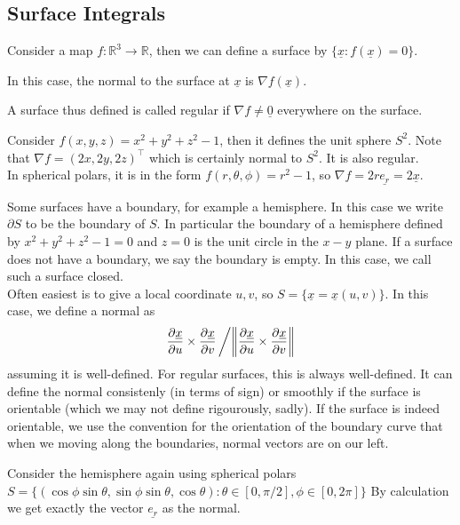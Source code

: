 \subsection{Surface Integrals}
\begin{definition}
    Consider a map $f:\mathbb R^3\to\mathbb R$, then we can define a surface by $\{\underline{x}:f(\underline{x})=0\}$.
\end{definition}
In this case, the normal to the surface at $\underline{x}$ is $\nabla f(\underline{x})$.
\begin{definition}
    A surface thus defined is called regular if $\nabla f\neq \underline{0}$ everywhere on the surface.
\end{definition}
\begin{example}
    Consider $f(x,y,z)=x^2+y^2+z^2-1$, then it defines the unit sphere $S^2$.
    Note that $\nabla f=(2x,2y,2z)^\top$ which is certainly normal to $S^2$.
    It is also regular.\\
    In spherical polars, it is in the form $f(r,\theta,\phi)=r^2-1$, so $\nabla f=2r\underline{e_r}=2\underline{x}$.
\end{example}
Some surfaces have a boundary, for example a hemisphere.
In this case we write $\partial S$ to be the boundary of $S$.
In particular the boundary of a hemisphere defined by $x^2+y^2+z^2-1=0$ and $z=0$ is the unit circle in the $x-y$ plane.
If a surface does not have a boundary, we say the boundary is empty.
In this case, we call such a surface closed.\\
Often easiest is to give a local coordinate $u,v$, so $S=\{\underline{x}=\underline{x}(u,v)\}$.
In this case, we define a normal as
$$\frac{\partial\underline{x}}{\partial u}\times\frac{\partial\underline{x}}{\partial v}\left/\middle\|\frac{\partial\underline{x}}{\partial u}\times\frac{\partial\underline{x}}{\partial v}\right\|$$
assuming it is well-defined.
For regular surfaces, this is always well-defined.
It can define the normal consistenly (in terms of sign) or smoothly if the surface is orientable (which we may not define rigourously, sadly).
If the surface is indeed orientable, we use the convention for the orientation of the boundary curve that when we moving along the boundaries, normal vectors are on our left.
\begin{example}
    Consider the hemisphere again using spherical polars $S=\{(\cos\phi\sin\theta,\sin\phi\sin\theta,\cos\theta):\theta\in[0,\pi/2],\phi\in[0,2\pi]\}$
    By calculation we get exactly the vector $\underline{e_r}$ as the normal.
\end{example}
